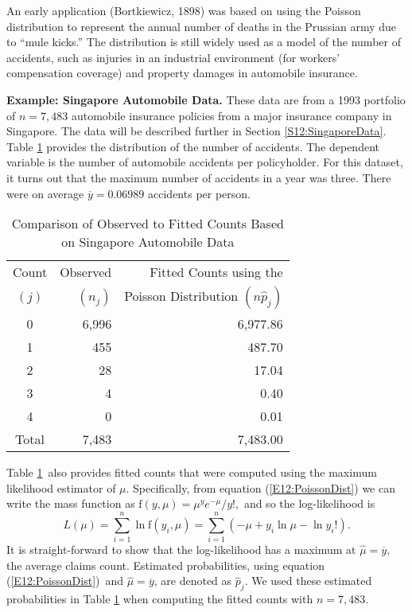 An early application (Bortkiewicz, 1898) was based on using the
Poisson distribution to represent the annual number of deaths in the
Prussian army due to ``mule kicks.'' The distribution is still
widely used as a model of the number of accidents, such as injuries
in an industrial environment (for workers' compensation coverage)
and property damages in automobile insurance.

\linejed{}

\textbf{Example: Singapore Automobile Data.} These data are from a
1993 portfolio of $n=7,483$ automobile insurance policies from a
major insurance company in Singapore. The data will be described
further in Section \ref{S12:SingaporeData}. Table \ref{T12:Table121}
provides the distribution of the number of accidents. The dependent
variable is the number of automobile accidents per policyholder. For
this dataset, it turns out that the maximum number of accidents in a
year was three. There were on average $\overline{y}=0.06989$
accidents per person.

\begin{table}[h]
\caption{\label{T12:Table121} Comparison of Observed to Fitted
Counts Based on Singapore Automobile Data}
\begin{center}
\begin{tabular}{crr}
\hline
Count & Observed & Fitted Counts using the \\
$(j)$ & $(n_j)$ & Poisson Distribution $(n\widehat{p}_j)$ \\
\hline
0 & 6,996 & 6,977.86 \\
1 & 455 & 487.70 \\
2 & 28 & 17.04 \\
3 & 4 & 0.40 \\
4 & 0 & 0.01 \\ \hline
Total & 7,483 & 7,483.00 \\ \hline
\end{tabular}\end{center}

\linetjed
\end{table}


Table \ref{T12:Table121}\ also provides fitted counts that were
computed using the maximum likelihood estimator of $\mu$.
Specifically, from equation (\ref{E12:PoissonDist}) we can write the
mass function as $\mathrm{f}(y,\mu) = \mu^y e^{-\mu} /y!,$ and so
the log-likelihood is
\begin{equation}\label{E12:BasicLogLike}
L(\mu) = \sum_{i=1}^{n} \ln \mathrm{f}(y_i,\mu) =
\sum_{i=1}^{n}\left( -\mu +y_i\ln \mu -\ln y_i!\right) .
\end{equation}
It is straight-forward to show that the log-likelihood has a maximum
at $\widehat{\mu }=\overline{y}$, the average claims count.
Estimated probabilities, using equation (\ref{E12:PoissonDist})\ and
$\widehat{\mu }= \overline{y}$, are denoted as $\widehat{p}_j$. We
used these estimated probabilities in Table \ref{T12:Table121} when
computing the fitted counts with $n=7,483$.

